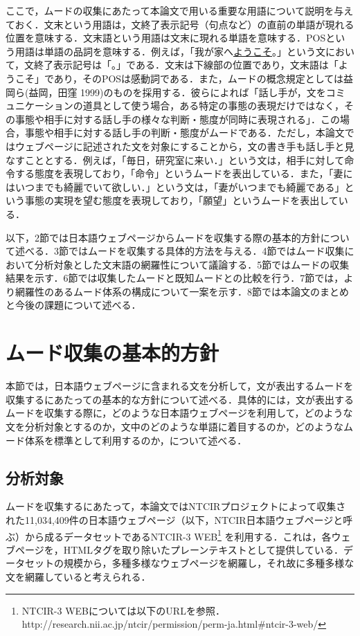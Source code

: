 \documentclass[japanese]{jnlp_1.4}
\begin{document}
ここで，ムードの収集にあたって本論文で用いる重要な用語について説明を与えておく．文末という用語は，文終了表示記号（句点など）の直前の単語が現れる位置を意味する．文末語という用語は文末に現れる単語を意味する．POSという用語は単語の品詞を意味する．例えば，「我が家へ\ul{ようこそ}。」という文において，文終了表示記号は「。」である．文末は下線部の位置であり，文末語は「ようこそ」であり，そのPOSは感動詞である．また，ムードの概念規定としては益岡ら(益岡，田窪 
1999)のものを採用する．彼らによれば「話し手が，文をコミュニケーションの道具として使う場合，ある特定の事態の表現だけではなく，その事態や相手に対する話し手の様々な判断・態度が同時に表現される」．この場合，事態や相手に対する話し手の判断・態度がムードである．ただし，本論文ではウェブページに記述された文を対象にすることから，文の書き手も話し手と見なすこととする．例えば，「毎日，研究室に来い．」という文は，相手に対して命令する態度を表現しており，「命令」というムードを表出している．また，「妻にはいつまでも綺麗でいて欲しい．」という文は，「妻がいつまでも綺麗である」という事態の実現を望む態度を表現しており，「願望」というムードを表出している．

以下，2節では日本語ウェブページからムードを収集する際の基本的方針について述べる．3節ではムードを収集する具体的方法を与える．4節ではムード収集において分析対象とした文末語の網羅性について議論する．5節ではムードの収集結果を示す．6節では収集したムードと既知ムードとの比較を行う．7節では，より網羅性のあるムード体系の構成について一案を示す．8節では本論文のまとめと今後の課題について述べる．



\section{ムード収集の基本的方針}

本節では，日本語ウェブページに含まれる文を分析して，文が表出するムードを収集するにあたっての基本的な方針について述べる．具体的には，文が表出するムードを収集する際に，どのような日本語ウェブページを利用して，どのような文を分析対象とするのか，文中のどのような単語に着目するのか，どのようなムード体系を標準として利用するのか，について述べる．

\subsection{分析対象}

ムードを収集するにあたって，本論文ではNTCIRプロジェクトによって収集された11,034,409件の日本語ウェブページ（以下，NTCIR日本語ウェブページと呼ぶ）から成るデータセットであるNTCIR-3 
WEB\footnote{
	NTCIR-3 WEBについては以下のURLを参照．\hfill\break
	http://research.nii.ac.jp/ntcir/permission/perm-ja.html{\#}ntcir-3-web/}
を利用する．これは，各ウェブページを，HTMLタグを取り除いたプレーンテキストとして提供している．データセットの規模から，多種多様なウェブページを網羅し，それ故に多種多様な文を網羅していると考えられる．
\end{document}
